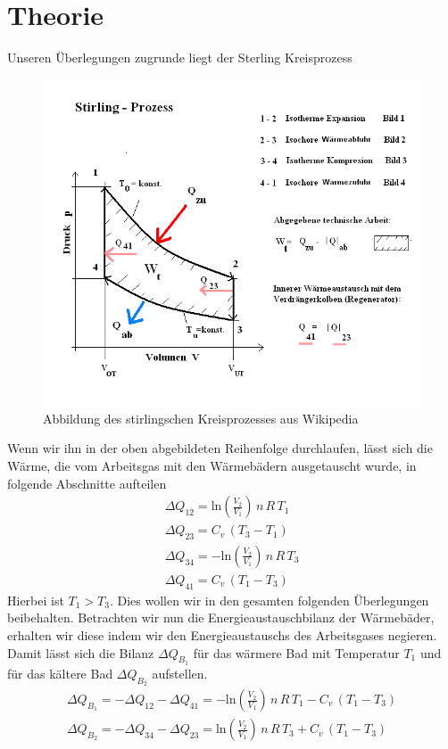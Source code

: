 \documentclass[a4paper, 12pt,]{scrartcl}
\begin{document}
\section{Theorie}
Unseren Überlegungen zugrunde liegt der Sterling Kreisprozess
\begin{figure}[H]\centering\includegraphics[scale=0.5]{Stirling-Prozess_3}\caption{Abbildung des stirlingschen Kreisprozesses aus Wikipedia}\end{figure}
Wenn wir ihn in der oben abgebildeten Reihenfolge durchlaufen, lässt sich die Wärme, die vom Arbeitsgas mit den Wärmebädern ausgetauscht wurde, in folgende Abschnitte aufteilen
\begin{gather*}\Delta{Q}_{12}=\text{ln}\left(\frac{V_2}{V_1}\right)\,n\,R\,T_1\\
\Delta{Q}_{23}=C_v\,(T_3-T_1)\\
\Delta{Q_{34}}=-\text{ln}\left(\frac{V_2}{V_1}\right)\,n\,R\,T_3\\
\Delta{Q_{41}}=C_v\,(T_1-T_3)\end{gather*}
Hierbei ist $T_1>T_3$. Dies wollen wir in den gesamten folgenden Überlegungen beibehalten. Betrachten wir nun die Energieaustauschbilanz der Wärmebäder, erhalten wir diese indem wir den Energieaustauschs des Arbeitsgases negieren. Damit lässt sich die Bilanz $\Delta{Q_{B_1}}$ für das wärmere Bad mit Temperatur $T_1$ und für das kältere Bad $\Delta{Q_{B_2}}$ aufstellen.
\begin{gather*}\Delta{Q_{B_1}}=-\Delta{Q}_{12}-\Delta{Q_{41}}=-\text{ln}\left(\frac{V_2}{V_1}\right)\,n\,R\,T_1-C_v\,(T_1-T_3)\\
\Delta{Q_{B_2}}=-\Delta{Q}_{34}-\Delta{Q_{23}}=\text{ln}\left(\frac{V_2}{V_1}\right)\,n\,R\,T_3+C_v\,(T_1-T_3)\end{gather*}
\end{document}

